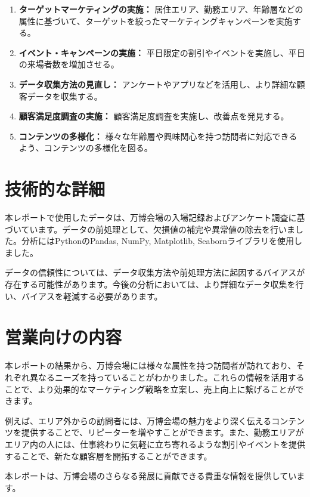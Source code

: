 \documentclass[11pt,a4paper]{article}
\begin{document}
\begin{enumerate}
    \item \textbf{ターゲットマーケティングの実施：} 居住エリア、勤務エリア、年齢層などの属性に基づいて、ターゲットを絞ったマーケティングキャンペーンを実施する。
    \item \textbf{イベント・キャンペーンの実施：} 平日限定の割引やイベントを実施し、平日の来場者数を増加させる。
    \item \textbf{データ収集方法の見直し：} アンケートやアプリなどを活用し、より詳細な顧客データを収集する。
    \item \textbf{顧客満足度調査の実施：} 顧客満足度調査を実施し、改善点を発見する。
    \item \textbf{コンテンツの多様化：} 様々な年齢層や興味関心を持つ訪問者に対応できるよう、コンテンツの多様化を図る。
\end{enumerate}

\section{技術的な詳細}

本レポートで使用したデータは、万博会場の入場記録およびアンケート調査に基づいています。データの前処理として、欠損値の補完や異常値の除去を行いました。分析にはPythonのPandas, NumPy, Matplotlib, Seabornライブラリを使用しました。

データの信頼性については、データ収集方法や前処理方法に起因するバイアスが存在する可能性があります。今後の分析においては、より詳細なデータ収集を行い、バイアスを軽減する必要があります。

\section{営業向けの内容}

本レポートの結果から、万博会場には様々な属性を持つ訪問者が訪れており、それぞれ異なるニーズを持っていることがわかりました。これらの情報を活用することで、より効果的なマーケティング戦略を立案し、売上向上に繋げることができます。

例えば、エリア外からの訪問者には、万博会場の魅力をより深く伝えるコンテンツを提供することで、リピーターを増やすことができます。また、勤務エリアがエリア内の人には、仕事終わりに気軽に立ち寄れるような割引やイベントを提供することで、新たな顧客層を開拓することができます。

本レポートは、万博会場のさらなる発展に貢献できる貴重な情報を提供しています。
\end{document}
